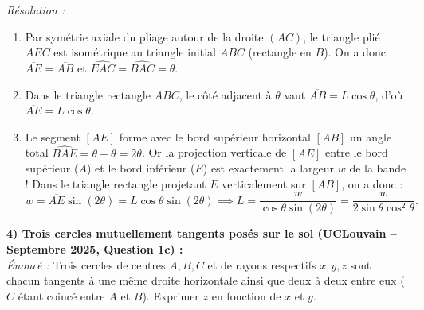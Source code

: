 \begin{exemple}
\begin{center}
\end{center}

\emph{Résolution :}
\begin{enumerate}
    \item Par symétrie axiale du pliage autour de la droite $(AC)$, le triangle plié $AEC$ est isométrique au triangle initial $ABC$ (rectangle en $B$). On a donc $\overline{AE} = \overline{AB}$ et $\widehat{EAC} = \widehat{BAC} = \theta$.
    \item Dans le triangle rectangle $ABC$, le côté adjacent à $\theta$ vaut $\overline{AB} = L\cos\theta$, d'où $\overline{AE} = L\cos\theta$.
    \item Le segment $[AE]$ forme avec le bord supérieur horizontal $[AB]$ un angle total $\widehat{BAE} = \theta + \theta = 2\theta$. Or la projection verticale de $[AE]$ entre le bord supérieur ($A$) et le bord inférieur ($E$) est exactement la largeur $w$ de la bande ! Dans le triangle rectangle projetant $E$ verticalement sur $[AB]$, on a donc :
    \[
        w = \overline{AE}\sin(2\theta) = L\cos\theta\sin(2\theta) \implies \boxed{L = \frac{w}{\cos\theta\sin(2\theta)} = \frac{w}{2\sin\theta\cos^2\theta}}.
    \]
\end{enumerate}

\medskip
\textbf{4) Trois cercles mutuellement tangents posés sur le sol (UCLouvain -- Septembre 2025, Question 1c) :}\\
\emph{Énoncé :} Trois cercles de centres $A, B, C$ et de rayons respectifs $x, y, z$ sont chacun tangents à une même droite horizontale ainsi que deux à deux entre eux ($C$ étant coincé entre $A$ et $B$). Exprimer $z$ en fonction de $x$ et $y$.


\end{exemple}
